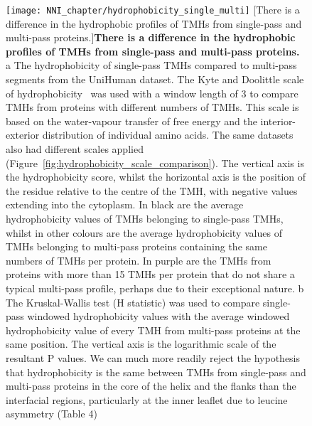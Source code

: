 \begin{figure}[!ht]
\centering
\texttt{[image: NNI\_chapter/hydrophobicity\_single\_multi]}
[There is a difference in the hydrophobic profiles of TMHs from single-pass and multi-pass proteins.]{\textbf{There is a difference in the hydrophobic profiles of TMHs from single-pass and multi-pass proteins.}
 a The hydrophobicity of single-pass TMHs compared to multi-pass segments from the UniHuman dataset. The Kyte and Doolittle scale of hydrophobicity~\cite{Kyte1982} was used with a window length of 3 to compare TMHs from proteins with different numbers of TMHs. This scale is based on the water-vapour transfer of free energy and the interior-exterior distribution of individual amino acids. The same datasets also had different scales applied (Figure~\ref{fig:hydrophobicity_scale_comparison}). The vertical axis is the hydrophobicity score, whilst the horizontal axis is the position of the residue relative to the centre of the TMH, with negative values extending into the cytoplasm. In black are the average hydrophobicity values of TMHs belonging to single-pass TMHs, whilst in other colours are the average hydrophobicity values of TMHs belonging to multi-pass proteins containing the same numbers of TMHs per protein. In purple are the TMHs from proteins with more than 15 TMHs per protein that do not share a typical multi-pass profile, perhaps due to their exceptional nature. b The Kruskal-Wallis test (H statistic) was used to compare single-pass windowed hydrophobicity values with the average windowed hydrophobicity value of every TMH from multi-pass proteins at the same position. The vertical axis is the logarithmic scale of the resultant P values. We can much more readily reject the hypothesis that hydrophobicity is the same between TMHs from single-pass and multi-pass proteins in the core of the helix and the flanks than the interfacial regions, particularly at the inner leaflet due to leucine asymmetry (Table 4)}

\label{fig:hydrophobicity_single_multi}
\end{figure}


